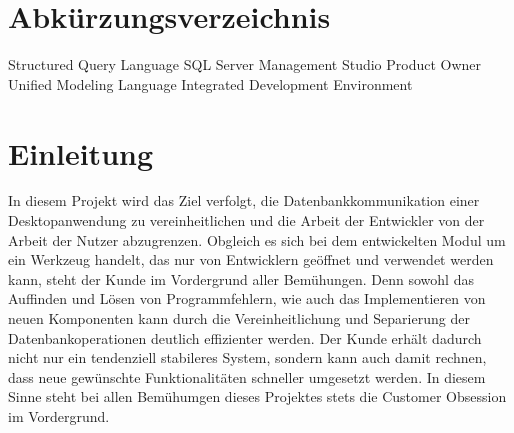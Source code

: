 \documentclass[11pt,toc=sectionentrywithoutdots, 
headheight=44pt, headings=optiontoheadandtoc, hyperfootnotes=false, hypertexnames=false]{scrartcl}
\begin{document}
\tableofcontents


\setcounter{secnumdepth}{0}

\newpage

{}
\listoffigures





{}
\listoftables


\section{Abkürzungsverzeichnis}


\begin{acronym}[xxxxxxx]

 {Structured Query Language}
 {SQL Server Management Studio}
 {Product Owner}
 {Unified Modeling Language}
 {Integrated Development Environment}

\end{acronym}
\clearpage

{}
\printglossary[nonumberlist]
\newpage


\setcounter{secnumdepth}{1}
\setcounter{secnumdepth}{4}

\section{Einleitung}
In diesem Projekt wird das Ziel verfolgt, die Datenbankkommunikation einer Desktopanwendung zu vereinheitlichen und die Arbeit der Entwickler von der Arbeit der Nutzer abzugrenzen. Obgleich es sich bei dem entwickelten Modul um ein Werkzeug handelt, das nur von Entwicklern geöffnet und verwendet werden kann, steht der Kunde im Vordergrund aller Bemühungen. Denn sowohl das Auffinden und Lösen von Programmfehlern, wie auch das Implementieren von neuen Komponenten kann durch die Vereinheitlichung und Separierung der Datenbankoperationen deutlich effizienter werden. Der Kunde erhält dadurch nicht nur ein tendenziell stabileres System, sondern kann auch damit rechnen, dass neue gewünschte Funktionalitäten schneller umgesetzt werden. In diesem Sinne steht bei allen Bemühumgen dieses Projektes stets die \gls{Customer Obsession} im Vordergrund.
\end{document}

